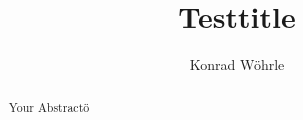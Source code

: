 \documentclass{article}
\title{Testtitle}
\author{Konrad Wöhrle}
\begin{document}
\maketitle

\begin{abstract}
Your Abstractö
\end{abstract}
\end{document}
